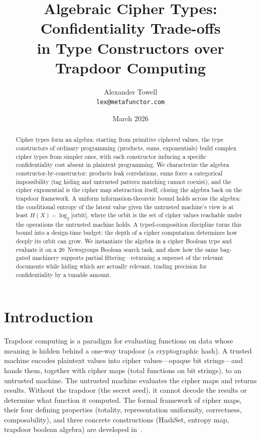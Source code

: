 \documentclass[11pt]{article}
\title{Algebraic Cipher Types: Confidentiality Trade-offs\\in Type Constructors over Trapdoor Computing}
\author{Alexander Towell\\\texttt{lex@metafunctor.com}}
\date{March 2026}
\theoremstyle{definition}
\theoremstyle{plain}
\theoremstyle{remark}
\begin{document}
\maketitle

\begin{abstract}
Cipher types form an algebra: starting from primitive ciphered values,
the type constructors of ordinary programming (products, sums,
exponentials) build complex cipher types from simpler ones, with each
constructor inducing a specific confidentiality cost absent in
plaintext programming.
We characterize the algebra constructor-by-constructor: products
leak correlations, sums force a categorical impossibility (tag
hiding and untrusted pattern matching cannot coexist), and the
cipher exponential is the cipher map abstraction itself, closing
the algebra back on the trapdoor framework.
A uniform information-theoretic bound holds across the algebra:
the conditional entropy of the latent value given the untrusted
machine's view is at least $H(X) - \log_2 |\mathrm{orbit}|$, where
the orbit is the set of cipher values reachable under the operations
the untrusted machine holds.
A typed-composition discipline turns this bound into a design-time
budget: the depth of a cipher computation determines how deeply its
orbit can grow.
We instantiate the algebra in a cipher Boolean type and evaluate it on
a 20~Newsgroups Boolean search task, and show how the same
bag-gated machinery supports partial filtering---returning a superset
of the relevant
documents while hiding which are actually relevant, trading precision
for confidentiality by a tunable amount.
\end{abstract}


\section{Introduction}
\label{sec:intro}

Trapdoor computing is a paradigm for evaluating functions on data whose
meaning is hidden behind a one-way trapdoor (a cryptographic hash).
A trusted machine encodes plaintext values into cipher values---opaque bit
strings---and hands them, together with cipher maps (total functions on
bit strings), to an untrusted machine.
The untrusted machine evaluates the cipher maps and returns results.
Without the trapdoor (the secret seed), it cannot decode the results or
determine what function it computed.
The formal framework of cipher maps, their four defining properties (totality,
representation uniformity, correctness, composability), and three concrete
constructions (HashSet, entropy map, trapdoor boolean algebra) are developed
in~\cite{towell2026cipher}.
\end{document}
